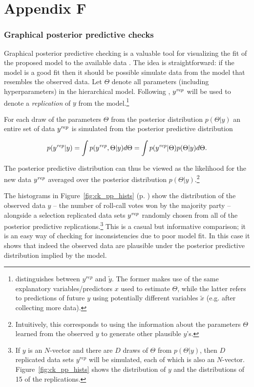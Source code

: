 \chapter*{Appendix F}\label{AppendixF}
\vspace{-1.75cm}
\subsection{Graphical posterior predictive checks}

Graphical posterior predictive checking is a valuable tool for visualizing the fit of the proposed model 
to the available data . The idea is straightforward: if the model is a good fit 
then it should be possible simulate data from the model that resembles the observed data. Let $\Theta$ 
denote all parameters (including hyperparameters) in the hierarchical model. Following 
 , $y^{\it rep}$ will be used to denote a {\it replication} of $y$ from the model.\footnote{ distinguishes between $y^{rep}$ and $\tilde{y}$. The former 
 makes use of the same explanatory variables/predictors $x$ used to estimate $\Theta$, while the latter 
 refers to predictions of future $y$ using potentially different variables $\tilde{x}$ (e.g. after collecting more data).}

For each draw of the parameters $\Theta$ from the posterior distribution $p(\Theta | y)$ an entire set 
of data $y^{\it rep} $ is simulated from the posterior predictive distribution

\begin{equation*}
 p(y^{\it rep} | y) = \int p(y^{\it rep}, \Theta | y) d\Theta = \int p(y^{\it rep} | \Theta) p(\Theta | y) d\Theta.
\end{equation*}

\noindent The posterior predictive distribution can thus be viewed as the likelihood for the new data 
$y^{\it rep}$ averaged over the posterior distribution  $p(\Theta | y)$.\footnote{
Intuitively, this corresponds to using the information about the parameters $\Theta$ learned from 
the observed $y$ to generate other plausible $y$'s.}

The histograms in Figure~\ref{fig:ck_pp_hists} (p. \pageref{fig:ck_pp_hists}) show the 
distribution of the observed data $y$ -- the number of roll-call votes won by the majority party 
-- alongside a selection replicated data sets $y^{\it rep}$ randomly chosen from all of the posterior 
predictive replications.\footnote{If $y$ is an $N$-vector and there are $D$ draws of 
$\Theta$ from $p(\Theta | y)$, then $D$ replicated data sets $y^{rep}$ will be simulated, 
each of which is also an $N$-vector. Figure~\ref{fig:ck_pp_hists} shows the distribution of $y$ and the
distributions of 15 of the replications.} This is a casual but informative comparison; it is an easy way 
of checking for inconsistencies due to poor model fit. In this case it shows that indeed the observed 
data are plausible under the posterior predictive distribution implied by the model. 



